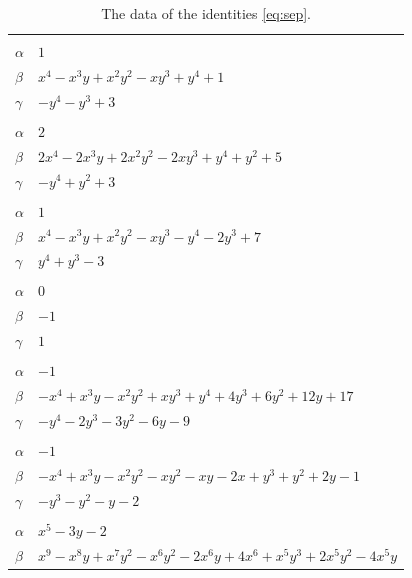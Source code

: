 \documentclass[11pt]{article}
\begin{document}
\begingroup\footnotesize
\setlength{\LTcapwidth}{\textwidth}
\begin{longtable}{@{}ll@{}}
\caption{The data of the identities \eqref{eq:sep}.}\label{tab:sep}\\
\hline\endfirsthead\hline\endhead\hline\endfoot
\multicolumn{2}{@{}l}{$\{i,j\}=\{2,4\}$, $k_{ij}=2^{2}$}\\
$\alpha$ & $1$\\
$\beta$ & $x^{4}-x^{3}y+x^{2}y^{2}-xy^{3}+y^{4}+1$\\
$\gamma$ & $-y^{4}-y^{3}+3$\\
\addlinespace[3pt]
\multicolumn{2}{@{}l}{$\{i,j\}=\{2,5\}$, $k_{ij}=2$}\\
$\alpha$ & $2$\\
$\beta$ & $2x^{4}-2x^{3}y+2x^{2}y^{2}-2xy^{3}+y^{4}+y^{2}+5$\\
$\gamma$ & $-y^{4}+y^{2}+3$\\
\addlinespace[3pt]
\multicolumn{2}{@{}l}{$\{i,j\}=\{2,11\}$, $k_{ij}=2^{2}$}\\
$\alpha$ & $1$\\
$\beta$ & $x^{4}-x^{3}y+x^{2}y^{2}-xy^{3}-y^{4}-2y^{3}+7$\\
$\gamma$ & $y^{4}+y^{3}-3$\\
\addlinespace[3pt]
\multicolumn{2}{@{}l}{$\{i,j\}=\{2,14\}$, $k_{ij}=2$}\\
$\alpha$ & $0$\\
$\beta$ & $-1$\\
$\gamma$ & $1$\\
\addlinespace[3pt]
\multicolumn{2}{@{}l}{$\{i,j\}=\{2,19\}$, $k_{ij}=17$}\\
$\alpha$ & $-1$\\
$\beta$ & $-x^{4}+x^{3}y-x^{2}y^{2}+xy^{3}+y^{4}+4y^{3}+6y^{2}+12y+17$\\
$\gamma$ & $-y^{4}-2y^{3}-3y^{2}-6y-9$\\
\addlinespace[3pt]
\multicolumn{2}{@{}l}{$\{i,j\}=\{2,25\}$, $k_{ij}=1$}\\
$\alpha$ & $-1$\\
$\beta$ & $-x^{4}+x^{3}y-x^{2}y^{2}-xy^{2}-xy-2x+y^{3}+y^{2}+2y-1$\\
$\gamma$ & $-y^{3}-y^{2}-y-2$\\
\addlinespace[3pt]
\multicolumn{2}{@{}l}{$\{i,j\}=\{2,32\}$, $k_{ij}=2^{4}\cdot 3$}\\
$\alpha$ & $x^{5}-3y-2$\\
$\beta$ & $x^{9}-x^{8}y+x^{7}y^{2}-x^{6}y^{2}-2x^{6}y+4x^{6}+x^{5}y^{3}+2x^{5}y^{2}-4x^{5}y$\\

\end{longtable}
\end{document}
